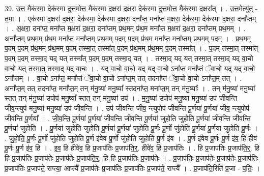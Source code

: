 \documentclass[17pt]{extarticle}
\begin{document}
39. उ॒त्त॒ मैक॑स्मा॒ देक॑स्मा दुत्त॒मोत्त॒ मैक॑स्मा द॒क्षरा॑ द॒क्षरा॒ देक॑स्मा दुत्त॒मोत्त॒ मैक॑स्मा द॒क्षरा᳚त् । . उ॒त्त॒मेत्यु॑त् - त॒मा । . एक॑स्मा द॒क्षरा॑ द॒क्षरा॒ देक॑स्मा॒ देक॑स्मा द॒क्षरा॒ दना᳚प्त॒ मना᳚प्त म॒क्षरा॒ देक॑स्मा॒ देक॑स्मा द॒क्षरा॒ दना᳚प्तम् । . अ॒क्षरा॒ दना᳚प्त॒ मना᳚प्त म॒क्षरा॑ द॒क्षरा॒ दना᳚प्तम् प्रथ॒मम् प्र॑थ॒म मना᳚प्त म॒क्षरा॑ द॒क्षरा॒ दना᳚प्तम् प्रथ॒मम् । . अना᳚प्तम् प्रथ॒मम् प्र॑थ॒म मना᳚प्त॒ मना᳚प्तम् प्रथ॒मम् प॒दम् प॒दम् प्र॑थ॒म मना᳚प्त॒ मना᳚प्तम् प्रथ॒मम् प॒दम् । . प्र॒थ॒मम् प॒दम् प॒दम् प्र॑थ॒मम् प्र॑थ॒मम् प॒दम् तस्मा॒त् तस्मा᳚त् प॒दम् प्र॑थ॒मम् प्र॑थ॒मम् प॒दम् तस्मा᳚त् । . प॒दम् तस्मा॒त् तस्मा᳚त् प॒दम् प॒दम् तस्मा॒द् यद् यत् तस्मा᳚त् प॒दम् प॒दम् तस्मा॒द् यत् । . तस्मा॒द् यद् यत् तस्मा॒त् तस्मा॒द् यद् वा॒चो वा॒चो यत् तस्मा॒त् तस्मा॒द् यद् वा॒चः । . यद् वा॒चो वा॒चो यद् यद् वा॒चो ऽना᳚प्त॒ मना᳚प्तं ॅवा॒चो यद् यद् वा॒चो ऽना᳚प्तम् । . वा॒चो ऽना᳚प्त॒ मना᳚प्तं ॅवा॒चो वा॒चो ऽना᳚प्त॒म् तत् तदना᳚प्तं ॅवा॒चो वा॒चो ऽना᳚प्त॒म् तत् । . अना᳚प्त॒म् तत् तदना᳚प्त॒ मना᳚प्त॒म् तन् म॑नु॒ष्या॑ मनु॒ष्या᳚ स्तदना᳚प्त॒ मना᳚प्त॒म् तन् म॑नु॒ष्याः᳚ । . तन् म॑नु॒ष्या॑ मनु॒ष्या᳚ स्तत् तन् म॑नु॒ष्या॑ उपोप॑ मनु॒ष्या᳚ स्तत् तन् म॑नु॒ष्या॑ उप॑ । . म॒नु॒ष्या॑ उपोप॑ मनु॒ष्या॑ मनु॒ष्या॑ उप॑ जीवन्ति जीव॒न्त्युप॑ मनु॒ष्या॑ मनु॒ष्या॑ उप॑ जीवन्ति । . उप॑ जीवन्ति जीव॒ न्त्युपोप॑ जीवन्ति पू॒र्णया॑ पू॒र्णया॑ जीव॒ न्त्युपोप॑ जीवन्ति पू॒र्णया᳚ । . जी॒व॒न्ति॒ पू॒र्णया॑ पू॒र्णया॑ जीवन्ति जीवन्ति पू॒र्णया॑ जुहोति जुहोति पू॒र्णया॑ जीवन्ति जीवन्ति पू॒र्णया॑ जुहोति । . पू॒र्णया॑ जुहोति जुहोति पू॒र्णया॑ पू॒र्णया॑ जुहोति पू॒र्णः पू॒र्णो जु॑होति पू॒र्णया॑ पू॒र्णया॑ जुहोति पू॒र्णः । . जु॒हो॒ति॒ पू॒र्णः पू॒र्णो जु॑होति जुहोति पू॒र्ण इ॑वेव पू॒र्णो जु॑होति जुहोति पू॒र्ण इ॑व । . पू॒र्ण इ॑वेव पू॒र्णः पू॒र्ण इ॑व॒ हि हीव॑ पू॒र्णः पू॒र्ण इ॑व॒ हि । . इ॒व॒ हि हीवे॑व॒ हि प्र॒जाप॑तिः प्र॒जाप॑ति॒र्॒. हीवे॑व॒ हि प्र॒जाप॑तिः । . हि प्र॒जाप॑तिः प्र॒जाप॑ति॒र्॒. हि हि प्र॒जाप॑तिः प्र॒जाप॑तेः प्र॒जाप॑तेः प्र॒जाप॑ति॒र्॒. हि हि प्र॒जाप॑तिः प्र॒जाप॑तेः । . प्र॒जाप॑तिः प्र॒जाप॑तेः प्र॒जाप॑तेः प्र॒जाप॑तिः प्र॒जाप॑तिः प्र॒जाप॑ते॒ राप्त्या॒ आप्त्यै᳚ प्र॒जाप॑तेः प्र॒जाप॑तिः प्र॒जाप॑तिः प्र॒जाप॑ते॒ राप्त्यै᳚ । . प्र॒जाप॑ति॒रिति॑ प्र॒जा - प॒तिः॒ । \newline
\pagebreak
{}
\end{document}
